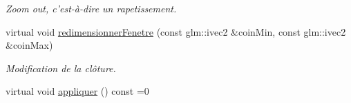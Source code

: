 \begin{DoxyCompactItemize}
\begin{DoxyCompactList}\small\item\em Zoom out, c'est-\/à-\/dire un rapetissement. \end{DoxyCompactList}\item 
virtual void \hyperlink{classvue_1_1_projection_ab68ac7207b5155c9649b05ff2f78b587}{redimensionner\-Fenetre} (const glm\-::ivec2 \&coin\-Min, const glm\-::ivec2 \&coin\-Max)
\begin{DoxyCompactList}\small\item\em Modification de la clôture. \end{DoxyCompactList}\item 
\hypertarget{classvue_1_1_projection_a88c8ee9ae0a1d08b48b94f6c093ee563}{virtual void \hyperlink{classvue_1_1_projection_a88c8ee9ae0a1d08b48b94f6c093ee563}{appliquer} () const =0}\label{classvue_1_1_projection_a88c8ee9ae0a1d08b48b94f6c093ee563}


\end{DoxyCompactItemize}
